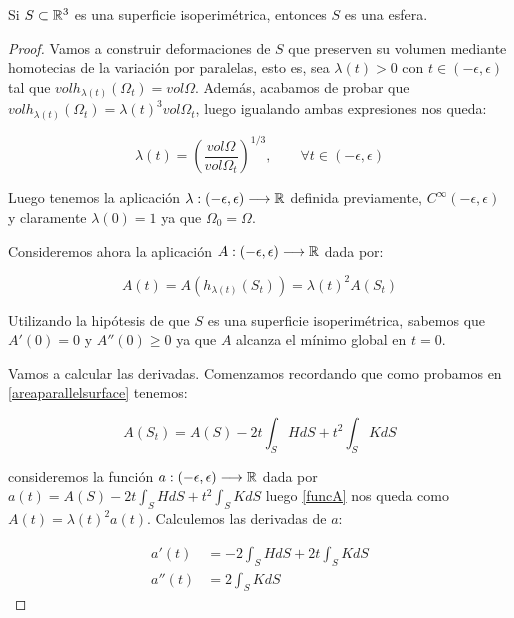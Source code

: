 \begin{theorem}
Si $S \subset \mathbb{R}^3$ es una superficie isoperimétrica, entonces $S$ es una esfera.
\end{theorem}
\begin{proof}
Vamos a construir deformaciones de $S$ que preserven su volumen mediante homotecias de la variación por paralelas, esto es, sea $\lambda(t) > 0$ con $t \in (-\epsilon, \epsilon)$ tal que $vol h_{\lambda(t)}(\Omega_t) = vol \Omega$. Además, acabamos de probar que $vol h_{\lambda(t)}(\Omega_t) = \lambda(t)^3 vol \Omega_t$, luego igualando ambas expresiones nos queda:

\begin{equation*}\label{lambdafunction}
    \lambda(t) = \left( \frac{vol \Omega}{vol \Omega_t} \right) ^{1/3}, \qquad \forall t \in (-\epsilon, \epsilon)
\end{equation*}

Luego tenemos la aplicación $\lambda: (-\epsilon, \epsilon) \longrightarrow \mathbb{R}$ definida previamente, $C^\infty(-\epsilon, \epsilon)$ y claramente $\lambda(0) = 1$ ya que $\Omega_0 = \Omega$. 

Consideremos ahora la aplicación $A: (-\epsilon, \epsilon) \longrightarrow \mathbb{R}$ dada por:

\begin{equation}\label{funcA}
    A(t) = A(h_{\lambda(t)} (S_t)) = \lambda(t)^2 A(S_t)
\end{equation}

Utilizando la hipótesis de que $S$ es una superficie isoperimétrica, sabemos que $A'(0) = 0$ y $A''(0) \geq 0$ ya que $A$ alcanza el mínimo global en $t=0$.

Vamos a calcular las derivadas. Comenzamos recordando que como probamos en \autoref{areaparallelsurface} tenemos:

\begin{equation*}
    A(S_t) = A(S) -2t\int_{S} HdS + t^2\int_{S} KdS
\end{equation*}

consideremos la función $a: (-\epsilon, \epsilon) \longrightarrow \mathbb{R}$ dada por $a(t) = A(S) -2t\int_{S} HdS + t^2\int_{S} KdS$ luego \autoref{funcA} nos queda como $A(t) = \lambda(t)^2 a(t)$. Calculemos las derivadas de $a$:

\begin{align*}
    a'(t) &= -2\int_{S} HdS + 2t\int_{S} KdS \\
    a''(t) &= 2\int_{S} KdS
\end{align*}


\end{proof}
